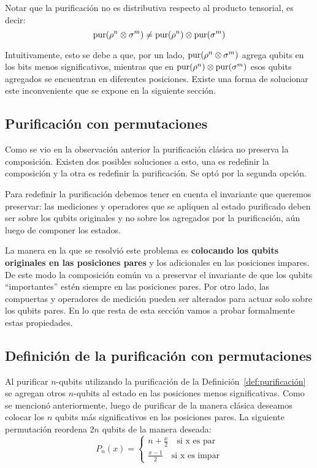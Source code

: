 \begin{observacion}
    Notar que la purificación no es distributiva respecto al producto tensorial, es decir:
\[\text{pur}(\rho^n \otimes \sigma^m) \neq \text{pur}(\rho^n) \otimes \text{pur}(\sigma^m)\]

Intuitivamente, esto se debe a que, por un lado, $\text{pur}(\rho^n \otimes \sigma^m)$ agrega qubits en los bits menos significativos, mientras que en $\text{pur}(\rho^n) \otimes \text{pur}(\sigma^m)$ esos qubits agregados se encuentran en diferentes posiciones. Existe una forma de solucionar este inconveniente que se expone en la siguiente sección.
\end{observacion}

\subsection{Purificación con permutaciones}
Como se vio en la observación anterior la purificación clásica no preserva la composición. Existen dos posibles soluciones a esto, una es redefinir la composición y la otra es redefinir la purificación. Se optó por la segunda opción.

Para redefinir la purificación debemos tener en cuenta el invariante que queremos preservar: las mediciones y operadores que se apliquen al estado purificado deben ser sobre los qubits originales y no sobre los agregados por la purificación, aún luego de componer los estados.

La manera en la que se resolvió este problema es \textbf{colocando los qubits originales en las posiciones pares} y los adicionales en las posiciones impares. De este modo la composición común va a preservar el invariante de que los qubits ``importantes'' estén siempre en las posiciones pares. Por otro lado, las compuertas y operadores de medición pueden ser alterados para actuar solo sobre los qubits pares. En lo que resta de esta sección vamos a probar formalmente estas propiedades.



\subsection*{Definición de la purificación con permutaciones}
Al purificar $n$-qubits utilizando la purificación de la Definición~\ref{def:purificación} se agregan otros $n$-qubits al estado en las posiciones menos significativas. Como se mencionó anteriormente, luego de purificar de la manera clásica deseamos colocar los $n$ qubits más significativos en las posiciones pares. La siguiente permutación reordena $2n$ qubits de la manera deseada:
\begin{equation}
P_n(x) = \begin{cases}
        n+\frac{x}{2} \quad\text{si x es par}\\
        \frac{x-1}{2} \quad\text{si x es impar}
    \end{cases}
\end{equation}

